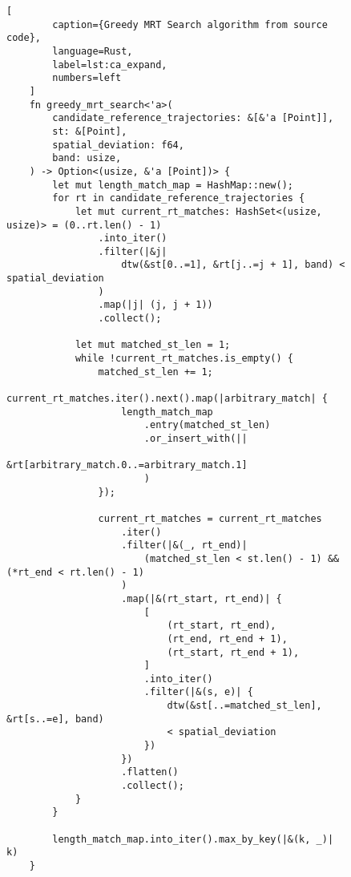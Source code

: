 \begin{figure}[t]
    \begin{lstlisting}[
        caption={Greedy MRT Search algorithm from source code},
        language=Rust,
        label=lst:ca_expand,
        numbers=left
    ]
    fn greedy_mrt_search<'a>(
        candidate_reference_trajectories: &[&'a [Point]],
        st: &[Point],
        spatial_deviation: f64,
        band: usize,
    ) -> Option<(usize, &'a [Point])> {
        let mut length_match_map = HashMap::new();
        for rt in candidate_reference_trajectories {
            let mut current_rt_matches: HashSet<(usize, usize)> = (0..rt.len() - 1)
                .into_iter()
                .filter(|&j|
                    dtw(&st[0..=1], &rt[j..=j + 1], band) < spatial_deviation
                )
                .map(|j| (j, j + 1))
                .collect();
    
            let mut matched_st_len = 1;
            while !current_rt_matches.is_empty() {
                matched_st_len += 1;
                current_rt_matches.iter().next().map(|arbitrary_match| {
                    length_match_map
                        .entry(matched_st_len)
                        .or_insert_with(||
                            &rt[arbitrary_match.0..=arbitrary_match.1]
                        )
                });
                
                current_rt_matches = current_rt_matches
                    .iter()
                    .filter(|&(_, rt_end)|
                        (matched_st_len < st.len() - 1) && (*rt_end < rt.len() - 1)
                    )
                    .map(|&(rt_start, rt_end)| {
                        [
                            (rt_start, rt_end),
                            (rt_end, rt_end + 1),
                            (rt_start, rt_end + 1),
                        ]
                        .into_iter()
                        .filter(|&(s, e)| {
                            dtw(&st[..=matched_st_len], &rt[s..=e], band) 
                            < spatial_deviation
                        })
                    })
                    .flatten()
                    .collect();
            }
        }
    
        length_match_map.into_iter().max_by_key(|&(k, _)| k)
    }
    \end{lstlisting}
\end{figure}